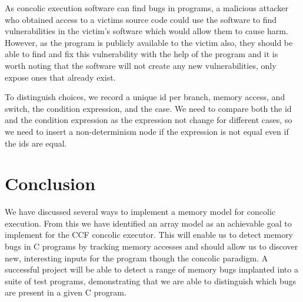 \documentclass[12pt,twoside]{report}
\begin{document}
 As concolic execution software can find bugs in programs, a malicious attacker who obtained access to a victims source code could use the software to find vulnerabilities in the victim's software which would allow them to cause harm. However, as the program is publicly available to the victim also, they should be able to find and fix this vulnerability with the help of the program and it is worth noting that the software will not create any new vulnerabilities, only expose ones that already exist.


To distinguish choices, we record a unique id per branch, memory access, and switch, the condition expression, and the case. We need to compare both the id and the condition expression as the expression not change for different cases, so we need to insert a non-determinism node if the expression is not equal even if the ids are equal.




\chapter{Conclusion}
We have discussed several ways to implement a memory model for concolic execution. From this we have identified an array model as an achievable goal to implement for the CCF concolic executor. This will enable us to detect memory bugs in C programs by tracking memory accesses and should allow us to discover new, interesting inputs for the program though the concolic paradigm. A successful project will be able to detect a range of memory bugs implanted into a suite of test programs, demonstrating that we are able to distinguish which bugs are present in a given C program.




\end{document}
